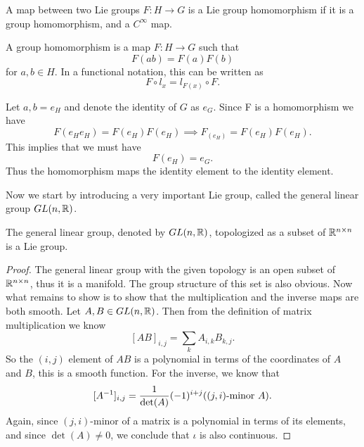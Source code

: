 \begin{definition}
	A map between two Lie groups $ F: H\to G $ is a Lie group homomorphism if it is a group homomorphism, and a $ C^\infty $ map.
\end{definition}
\begin{remark}
	A group homomorphism is a map $ F:H\to G $ such that 
	\[ F(ab) = F(a) F(b) \]
	for $ a,b \in H $.
	In a functional notation, this can be written as
	\[ F\circ l_x = l_{F(x)} \circ F. \]
\end{remark}
\begin{remark}
	Let $ a,b = e_H $ and denote the identity of $ G $ as $ e_G $. Since F is a homomorphism we have
	\[ F(e_H e_H) = F(e_H) F(e_H) \implies F_(e_H) = F(e_H)F(e_H).  \]
	This implies that we must have
	\[ F(e_H) = e_G. \]
	Thus the homomorphism maps the identity element to the identity element.
\end{remark}

Now we start by introducing a very important Lie group, called the general linear group $ GL(n,\mathbb{R}) $. 

\begin{proposition}
	The general linear group, denoted by $ GL(n,\mathbb{R}) $, topologized as a subset of $ \mathbb{R}^{n\times n}$ is a Lie group.
\end{proposition}
\begin{proof}
	The general linear group with the given topology is an open subset of $ \mathbb{R}^{n\times n} $, thus it is a manifold. The group structure of this set is also obvious. Now what remains to show is to show that the multiplication and the inverse maps are both smooth. Let $ A, B \in GL(n,\mathbb{R}) $. Then from the definition of matrix multiplication we know
	\[ [AB]_{i,j} = \sum_k A_{i,k} B_{k,j}. \]
	So the $ (i,j) $ element of $ AB $ is a polynomial in terms of the coordinates of $ A $ and $ B $, this is a smooth function.
	For the inverse, we know that 
	\[ [A^{-1}]_{i,j} = \frac{1}{\det(A)} (-1)^{i+j}((j,i)\text{-minor }A). \]
	Again, since $ (j,i)\text{-minor} $ of a matrix is a polynomial in terms of its elements, and since $ \det(A) \neq 0 $, we conclude that $ \iota $ is also continuous.
\end{proof}










\newpage
